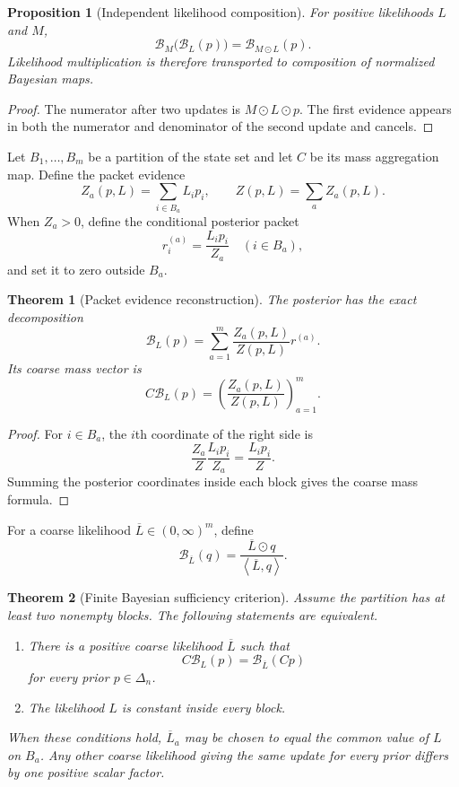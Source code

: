 \documentclass{aomart}
\newtheorem{theorem}{Theorem}[section]
\newtheorem{proposition}[proposition]{Proposition}
\theoremstyle{definition}
\theoremstyle{remark}
\newcommand{\Bcal}{\mathcal B}
\newcommand{\ip}[2]{\left\langle#1,#2\right\rangle}
\begin{document}
\begin{proposition}[Independent likelihood composition]\label{prop:bayes_composition}
For positive likelihoods \(L\) and \(M\),
\[
\boxed{
\Bcal_M\bigl(\Bcal_L(p)\bigr)
=
\Bcal_{M\odot L}(p).
}
\]
Likelihood multiplication is therefore transported to composition of normalized Bayesian maps.
\end{proposition}

\begin{proof}
The numerator after two updates is \(M\odot L\odot p\). The first evidence appears in both the numerator and denominator of the second update and cancels.
\end{proof}

Let \(B_1,\ldots,B_m\) be a partition of the state set and let \(C\) be its mass aggregation map. Define the packet evidence
\[
Z_a(p,L)=\sum_{i\in B_a}L_ip_i,
\qquad
Z(p,L)=\sum_aZ_a(p,L).
\]
When \(Z_a>0\), define the conditional posterior packet
\[
r_i^{(a)}
=
\frac{L_ip_i}{Z_a}
\quad(i\in B_a),
\]
and set it to zero outside \(B_a\).

\begin{theorem}[Packet evidence reconstruction]\label{thm:packet_evidence}
The posterior has the exact decomposition
\[
\boxed{
\Bcal_L(p)
=
\sum_{a=1}^m
\frac{Z_a(p,L)}{Z(p,L)}r^{(a)}.
}
\]
Its coarse mass vector is
\[
C\Bcal_L(p)
=
\left(
\frac{Z_a(p,L)}{Z(p,L)}
\right)_{a=1}^m.
\]
\end{theorem}

\begin{proof}
For \(i\in B_a\), the \(i\)th coordinate of the right side is
\[
\frac{Z_a}{Z}\frac{L_ip_i}{Z_a}
=
\frac{L_ip_i}{Z}.
\]
Summing the posterior coordinates inside each block gives the coarse mass formula.
\end{proof}

For a coarse likelihood \(\overline L\in(0,\infty)^m\), define
\[
\Bcal_{\overline L}(q)
=
\frac{\overline L\odot q}{\ip{\overline L}{q}}.
\]

\begin{theorem}[Finite Bayesian sufficiency criterion]\label{thm:bayesian_sufficiency}
Assume the partition has at least two nonempty blocks. The following statements are equivalent.

\begin{enumerate}
\item There is a positive coarse likelihood \(\overline L\) such that
\[
C\Bcal_L(p)
=
\Bcal_{\overline L}(Cp)
\]
for every prior \(p\in\Delta_n\).

\item The likelihood \(L\) is constant inside every block.
\end{enumerate}

When these conditions hold, \(\overline L_a\) may be chosen to equal the common value of \(L\) on \(B_a\). Any other coarse likelihood giving the same update for every prior differs by one positive scalar factor.
\end{theorem}
\end{document}
